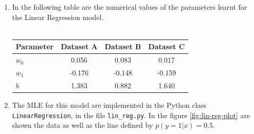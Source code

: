 \documentclass[a4paper, 11pt]{article}
\begin{document}
\begin{enumerate}[label=\alph*]
    \item In the following table are the numerical values of the parameters learnt for the Linear Regression model. \\
    \\
        \begin{tabular}{ | l || *{3}{c| } }
             \hline
                Parameter & Dataset A & Dataset B & Dataset C \\
             \hline			
               $w_0$ & 0.056 & 0.083 & 0.017 \\
               $w_1$ & -0.176 & -0.148 & -0.159 \\
               $b$ & 1.383 & 0.882 & 1.640 \\
             \hline  
         \end{tabular}
    
    \item The MLE for this model are implemented in the Python class \texttt{LinearRegression}, in the file \texttt{lin\_reg.py}. In the figure \ref{fig:lin-reg-plot} are shown the data as well as the line defined by $p \left( y=1 | x \right) = 0.5$.
    

\end{enumerate}
\end{document}

